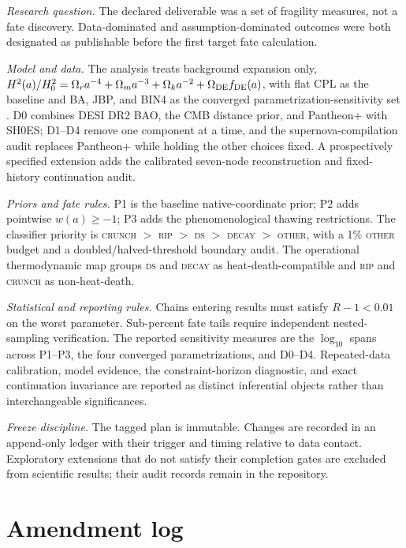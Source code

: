 \documentclass[a4paper,11pt]{article}
\begin{document}
\emph{Research question.} The declared deliverable was a set of fragility
measures, not a fate discovery. Data-dominated and assumption-dominated
outcomes were both designated as publishable before the first target fate
calculation.

\emph{Model and data.} The analysis treats background expansion only,
$H^2(a)/H_0^2=\Omega_r a^{-4}+\Omega_m a^{-3}+\Omega_k a^{-2}
+\Omega_{\rm DE}f_{\rm DE}(a)$, with flat CPL as the baseline and BA, JBP,
and BIN4 as the converged parametrization-sensitivity set
\cite{BarbozaAlcaniz2008,JBP2005}. D0 combines DESI DR2 BAO, the CMB distance
prior, and Pantheon+ with SH0ES; D1--D4 remove one component at a time, and
the supernova-compilation audit replaces Pantheon+ while holding the other
choices fixed. A prospectively specified extension adds the calibrated
seven-node reconstruction and fixed-history continuation audit.

\emph{Priors and fate rules.} P1 is the baseline native-coordinate prior; P2
adds pointwise $w(a)\ge-1$; P3 adds the phenomenological thawing restrictions.
The classifier priority is \textsc{crunch} $>$ \textsc{rip} $>$ \textsc{ds}
$>$ \textsc{decay} $>$ \textsc{other}, with a 1\% \textsc{other} budget and
a doubled/halved-threshold boundary audit. The operational thermodynamic map
groups \textsc{ds} and \textsc{decay} as heat-death-compatible and
\textsc{rip} and \textsc{crunch} as non-heat-death.

\emph{Statistical and reporting rules.} Chains entering results must satisfy
$R-1<0.01$ on the worst parameter. Sub-percent fate tails require independent
nested-sampling verification. The reported sensitivity measures are the
$\log_{10}$ spans across P1--P3, the four converged parametrizations, and
D0--D4. Repeated-data calibration, model evidence, the constraint-horizon
diagnostic, and exact continuation invariance are reported as distinct
inferential objects rather than interchangeable significances.

\emph{Freeze discipline.} The tagged plan is immutable. Changes are recorded
in an append-only ledger with their trigger and timing relative to data contact.
Exploratory extensions that do not satisfy their completion gates are excluded
from scientific results; their audit records remain in the repository.

\section{Amendment log}\label{app:amendments}
\end{document}
